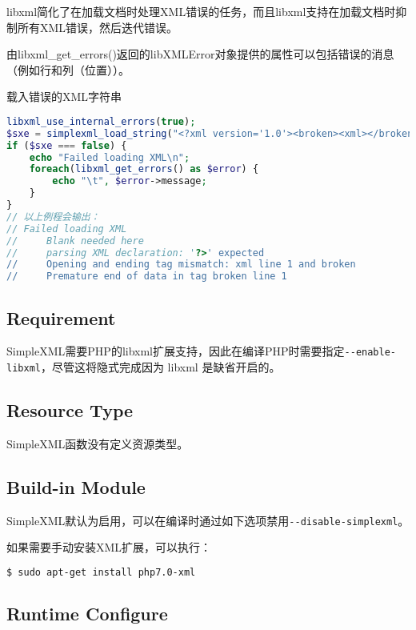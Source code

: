 libxml简化了在加载文档时处理XML错误的任务，而且libxml支持在加载文档时抑制所有XML错误，然后迭代错误。

由libxml\_get\_errors()返回的libXMLError对象提供的属性可以包括错误的消息（例如行和列（位置））。


\begin{example}
载入错误的XML字符串
\begin{lstlisting}[language=PHP]
libxml_use_internal_errors(true);
$sxe = simplexml_load_string("<?xml version='1.0'><broken><xml></broken>");
if ($sxe === false) {
    echo "Failed loading XML\n";
    foreach(libxml_get_errors() as $error) {
        echo "\t", $error->message;
    }
}
// 以上例程会输出：
// Failed loading XML
//     Blank needed here
//     parsing XML declaration: '?>' expected
//     Opening and ending tag mismatch: xml line 1 and broken
//     Premature end of data in tag broken line 1
\end{lstlisting}
\end{example}



\subsection{Requirement}

SimpleXML需要PHP的libxml扩展支持，因此在编译PHP时需要指定\texttt{-\/-enable-libxml}，尽管这将隐式完成因为 libxml 是缺省开启的。



\subsection{Resource Type}

SimpleXML函数没有定义资源类型。


\subsection{Build-in Module}

SimpleXML默认为启用，可以在编译时通过如下选项禁用\texttt{-\/-disable-simplexml}。

如果需要手动安装XML扩展，可以执行：

\begin{lstlisting}[language=bash]
$ sudo apt-get install php7.0-xml
\end{lstlisting}



\subsection{Runtime Configure}


